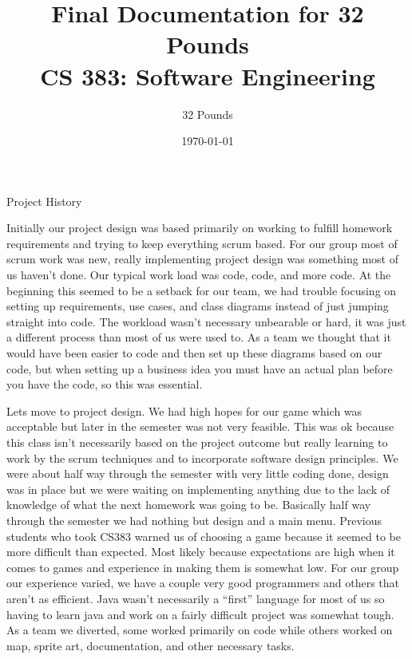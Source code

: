 \documentclass[12pt]{report}
\begin{document}
\title{Final Documentation for 32 Pounds\\ \vspace{2 mm} {\large CS 383: Software Engineering}}

\author{32 Pounds}
\date{\today}
\maketitle
\clearpage
\tableofcontents

\begin{chapter}{Project History}
	
	Initially our project design was based primarily on working to fulfill homework requirements and trying to keep everything scrum based.  
	For our group most of scrum work was new, really implementing project design was something most of us haven't done.  
	Our typical work load was code, code, and more code.  At the beginning this seemed to be a setback for our team, we had trouble focusing on setting up requirements, use cases, and class diagrams instead of just jumping straight into code.  
	The workload wasn't necessary unbearable or hard, it was just a different process than most of us were used to.  
	As a team we thought that it would have been easier to code and then set up these diagrams based on our code, but when setting up a business idea you must have an actual plan before you have the code, so this was essential.  
	
	Lets move to project design.
	We had high hopes for our game which was acceptable but later in the semester was not very feasible.  
	This was ok because this class isn't necessarily based on the project outcome but really learning to work by the scrum techniques and to incorporate software design principles. 
	We were about half way through the semester with very little coding done, design was in place but we were waiting on implementing anything due to the lack of knowledge of what the next homework was going to be. 
	Basically half way through the semester we had nothing but design and a main menu. 
	Previous students who took CS383 warned us of choosing a game because it seemed to be more difficult than expected.  
	Most likely because expectations are high when it comes to games and experience in making them is somewhat low.  
	For our group our experience varied, we have a couple very good programmers and others that aren't as efficient.  
	Java wasn't necessarily a “first” language for most of us so having to learn java and work on a fairly difficult project was somewhat tough.  
	As a team we diverted, some worked primarily on code while others worked on map, sprite art, documentation, and other necessary tasks.  
	

\end{chapter}
\end{document}
